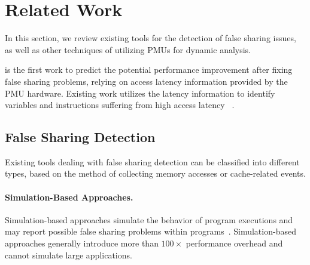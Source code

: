 \section{Related Work}

\label{sec:relatedwork}

 

In this section, we review existing tools for the detection of false sharing issues, as well as other techniques of utilizing PMUs for dynamic analysis.

\cheetah{} is the first work to predict the potential performance improvement after fixing false sharing problems, relying on access latency information provided by the PMU hardware. Existing work utilizes the latency information to identify variables and instructions suffering from high access latency ~\cite{ibs-sc, ibs-pact}. 

\subsection{False Sharing Detection}

Existing tools dealing with false sharing detection can be classified into different types, based on the method of collecting memory accesses or cache-related events. 

\paragraph{Simulation-Based Approaches.} Simulation-based approaches simulate the behavior of program executions and may report possible false sharing problems within programs~\cite{falseshare:simulator}. Simulation-based approaches generally introduce more than $100\times$ performance overhead and cannot simulate large applications. 

